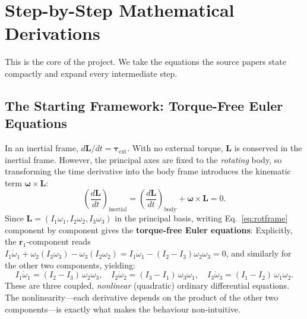 \documentclass[11pt,letterpaper]{article}
\begin{document}
\section{Step-by-Step Mathematical Derivations}
\label{sec:derivations}
This is the core of the project. We take the equations the source papers state
compactly and expand every intermediate step.

\subsection{The Starting Framework: Torque-Free Euler Equations}
In an inertial frame, $d\mathbf{L}/dt = \boldsymbol{\tau}_{\text{ext}}$. With no
external torque, $\mathbf{L}$ is conserved in the inertial frame. However, the
principal axes are fixed to the \emph{rotating} body, so transforming the time
derivative into the body frame introduces the kinematic term
$\boldsymbol{\omega}\times\mathbf{L}$:
\begin{equation}\label{eq:rotframe}
\left(\frac{d\mathbf{L}}{dt}\right)_{\text{inertial}}
= \left(\frac{d\mathbf{L}}{dt}\right)_{\text{body}}
+ \boldsymbol{\omega}\times\mathbf{L} = 0 .
\end{equation}
Since $\mathbf{L}=(I_1\omega_1, I_2\omega_2, I_3\omega_3)$ in the principal
basis, writing Eq.~\eqref{eq:rotframe} component by component gives the
\textbf{torque-free Euler equations}:
Explicitly, the $\mathbf{r}_1$-component reads
$I_1\dot\omega_1 + \omega_2(I_3\omega_3) - \omega_3(I_2\omega_2)
= I_1\dot\omega_1 - (I_2-I_3)\omega_2\omega_3 = 0$,
and similarly for the other two components, yielding:
\begin{equation}\label{eq:euler}
\boxed{\;
I_1\dot{\omega}_1 = (I_2 - I_3)\,\omega_2\omega_3, \quad
I_2\dot{\omega}_2 = (I_3 - I_1)\,\omega_3\omega_1, \quad
I_3\dot{\omega}_3 = (I_1 - I_2)\,\omega_1\omega_2 . \;}
\end{equation}
These are three coupled, \emph{nonlinear} (quadratic) ordinary differential
equations. The nonlinearity---each derivative depends on the product of the
other two components---is exactly what makes the behaviour non-intuitive.
\end{document}
